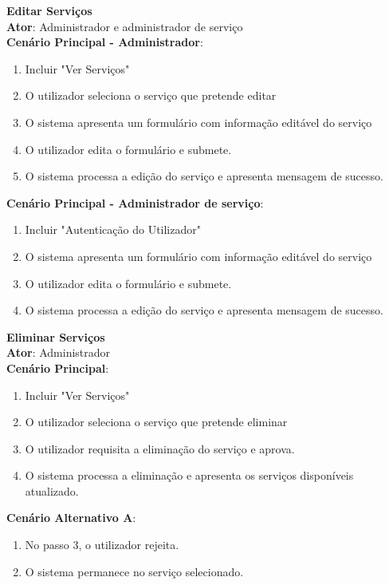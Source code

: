 {\large\textbf{Editar Serviços}} \\
\textbf{Ator}: Administrador e administrador de serviço  \\
\textbf{Cenário Principal - Administrador}:

\begin{enumerate}[nolistsep]
	\item Incluir "Ver Serviços"
	\item O utilizador seleciona o serviço que pretende editar
	\item O sistema apresenta um formulário com informação editável do serviço
	\item O utilizador edita o formulário e submete.
	\item O sistema processa a edição do serviço e apresenta mensagem de sucesso.
\end{enumerate}

\textbf{Cenário Principal - Administrador de serviço}:
\begin{enumerate}[nolistsep]
	\item Incluir "Autenticação do Utilizador"
	\item O sistema apresenta um formulário com informação editável do serviço
	\item O utilizador edita o formulário e submete.
	\item O sistema processa a edição do serviço e apresenta mensagem de sucesso.
\end{enumerate}

{\large\textbf{Eliminar Serviços}} \\
\textbf{Ator}: Administrador \\
\textbf{Cenário Principal}:

\begin{enumerate}[nolistsep]
	\item Incluir "Ver Serviços"
	\item O utilizador seleciona o serviço que pretende eliminar
	\item O utilizador requisita a eliminação do serviço e aprova.
	\item O sistema processa a eliminação e apresenta os serviços disponíveis atualizado.
\end{enumerate}

\textbf{Cenário Alternativo A}:

\begin{enumerate}[nolistsep]
	\item No passo 3, o utilizador rejeita.
	\item O sistema permanece no serviço selecionado.
\end{enumerate}

